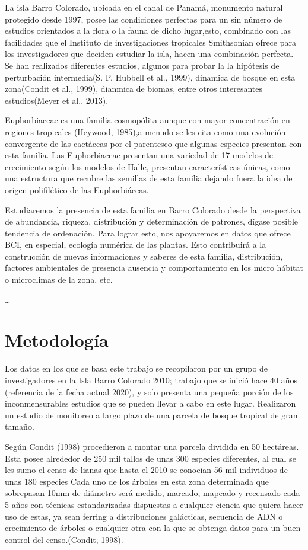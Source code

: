 \documentclass[11pt,]{article}
\begin{document}
La isla Barro Colorado, ubicada en el canal de Panamá, monumento natural
protegido desde 1997, posee las condiciones perfectas para un sin número
de estudios orientados a la flora o la fauna de dicho lugar,esto,
combinado con las facilidades que el Instituto de investigaciones
tropicales Smithsonian ofrece para los investigadores que deciden
estudiar la isla, hacen una combinación perfecta. Se han realizados
diferentes estudios, algunos para probar la la hipótesis de perturbación
intermedia(S. P. Hubbell et al., 1999), dinamica de bosque en esta
zona(Condit et al., 1999), dianmica de biomas, entre otros interesantes
estudios(Meyer et al., 2013).

Euphorbiaceae es una familia cosmopólita aunque con mayor concentración
en regiones tropicales (Heywood, 1985),a menudo se les cita como una
evolución convergente de las cactáceas por el parentesco que algunas
especies presentan con esta familia. Las Euphorbiaceae presentan una
variedad de 17 modelos de crecimiento según los modelos de Halle,
presentan características únicas, como una estructura que recubre las
semillas de esta familia dejando fuera la idea de origen polifilético de
las Euphorbiáceas.

Estudiaremos la presencia de esta familia en Barro Colorado desde la
perspectiva de abundancia, riqueza, distribución y determinación de
patrones, dígase posible tendencia de ordenación. Para lograr esto, nos
apoyaremos en datos que ofrece BCI, en especial, ecología numérica de
las plantas. Esto contribuirá a la construcción de nuevas informaciones
y saberes de esta familia, distribución, factores ambientales de
presencia ausencia y comportamiento en los micro hábitat o microclimas
de la zona, etc.

\ldots

\section{Metodología}\label{metodologuxeda}

Los datos en los que se basa este trabajo se recopilaron por un grupo de
investigadores en la Isla Barro Colorado 2010; trabajo que se inició
hace 40 años (referencia de la fecha actual 2020), y solo presenta una
pequeña porción de los inconmensurables estudios que se pueden llevar a
cabo en este lugar. Realizaron un estudio de monitoreo a largo plazo de
una parcela de bosque tropical de gran tamaño.

Según Condit (1998) procedieron a montar una parcela dividida en 50
hectáreas. Esta posee alrededor de 250 mil tallos de unas 300 especies
diferentes, al cual se les sumo el censo de lianas que hasta el 2010 se
conocian 56 mil individuos de unas 180 especies Cada uno de los árboles
en esta zona determinada que sobrepasan 10mm de diámetro será medido,
marcado, mapeado y recensado cada 5 años con técnicas estandarizadas
dispuestas a cualquier ciencia que quiera hacer uso de estas, ya sean
ferring a distribuciones galácticas, secuencia de ADN o crecimiento de
árboles o cualquier otra con la que se obtenga datos para un buen
control del censo.(Condit, 1998).
\end{document}

